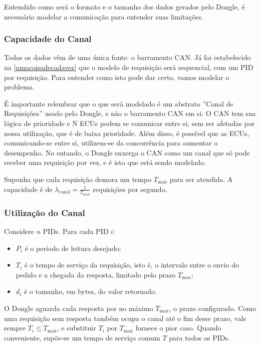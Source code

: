 \documentclass[12pt]{article}
\begin{document}
Entendido como será o formato e o tamanho dos dados gerados pelo Dongle, é necessário modelar a comunicação para entender suas limitações.

\subsubsection{Capacidade do Canal}

Todos os dados vêm de uma única fonte: o barramento CAN. Já foi estabelecido na \autoref{umacoisadecadavez} que o modelo de requisição será sequencial, com um PID por requisição. Para entender como isto pode dar certo, vamos modelar o problema.

É importante relembrar que o que será modelado é um abstrato ''Canal de Requisições'' usado pelo Dongle, e não o barramento CAN em si. O CAN tem sua lógica de prioridade e N ECUs podem se comunicar entre si, sem ser afetadas por nossa utilização, que é de baixa prioridade. Além disso, é possível que as ECUs, comunicando-se entre si, utilizem-se da concorrência para aumentar o desempenho. No entando, o Dongle enxerga o CAN como um canal que só pode receber uma requisição por vez, e é isto que está sendo modelado.

Suponha que cada requisição demora um tempo $T_{\mathrm{max}}$ para ser atendida. A capacidade é de $\lambda_{\mathrm{canal}} = \frac{1}{T_{\mathrm{max}}}$ requisições por segundo.

\subsubsection{Utilização do Canal}

Considere $n$ PIDs. Para cada PID $i$:
 
\begin{itemize}
  \item $P_i$ é o período de leitura desejado;
  \item $T_i$ é o tempo de serviço da requisição, isto é, o intervalo entre o envio do pedido e a chegada da resposta, limitado pelo prazo $T_{\max}$;
  \item $d_i$ é o tamanho, em bytes, do valor retornado.
\end{itemize}

O Dongle aguarda cada resposta por no máximo $T_{\max}$, o prazo configurado. Como uma requisição sem resposta também ocupa o canal até o fim desse prazo, vale sempre $T_i \le T_{\max}$, e substituir $T_i$ por $T_{\max}$ fornece o pior caso. Quando conveniente, supõe-se um tempo de serviço comum $T$ para todos os PIDs.
 
\end{document}

